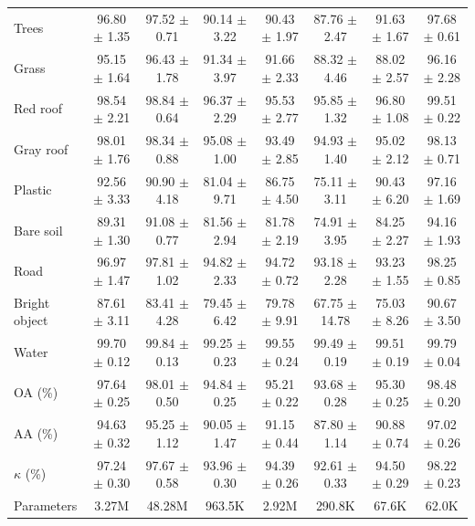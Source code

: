\begin{table}[htbp]
{\begin{tabular}{l c c c c c c c}
    Trees & \textcolor{tgred}{96.80 $\pm$ 1.35} & \textcolor{tgblue}{97.52 $\pm$ 0.71} & 90.14 $\pm$ 3.22 & 90.43 $\pm$ 1.97 & 87.76 $\pm$ 2.47 & 91.63 $\pm$ 1.67 & \textcolor{tgteal}{97.68 $\pm$ 0.61} \\
    Grass & \textcolor{tgred}{95.15 $\pm$ 1.64} & \textcolor{tgteal}{96.43 $\pm$ 1.78} & 91.34 $\pm$ 3.97 & 91.66 $\pm$ 2.33 & 88.32 $\pm$ 4.46 & 88.02 $\pm$ 2.57 & \textcolor{tgblue}{96.16 $\pm$ 2.28} \\
    Red roof & \textcolor{tgred}{98.54 $\pm$ 2.21} & \textcolor{tgblue}{98.84 $\pm$ 0.64} & 96.37 $\pm$ 2.29 & 95.53 $\pm$ 2.77 & 95.85 $\pm$ 1.32 & 96.80 $\pm$ 1.08 & \textcolor{tgteal}{99.51 $\pm$ 0.22} \\
    Gray roof & \textcolor{tgred}{98.01 $\pm$ 1.76} & \textcolor{tgteal}{98.34 $\pm$ 0.88} & 95.08 $\pm$ 1.00 & 93.49 $\pm$ 2.85 & 94.93 $\pm$ 1.40 & 95.02 $\pm$ 2.12 & \textcolor{tgblue}{98.13 $\pm$ 0.71} \\
    Plastic & \textcolor{tgblue}{92.56 $\pm$ 3.33} & \textcolor{tgred}{90.90 $\pm$ 4.18} & 81.04 $\pm$ 9.71 & 86.75 $\pm$ 4.50 & 75.11 $\pm$ 3.11 & 90.43 $\pm$ 6.20 & \textcolor{tgteal}{97.16 $\pm$ 1.69} \\
    Bare soil & \textcolor{tgred}{89.31 $\pm$ 1.30} & \textcolor{tgblue}{91.08 $\pm$ 0.77} & 81.56 $\pm$ 2.94 & 81.78 $\pm$ 2.19 & 74.91 $\pm$ 3.95 & 84.25 $\pm$ 2.27 & \textcolor{tgteal}{94.16 $\pm$ 1.93} \\
    Road & \textcolor{tgred}{96.97 $\pm$ 1.47} & \textcolor{tgblue}{97.81 $\pm$ 1.02} & 94.82 $\pm$ 2.33 & 94.72 $\pm$ 0.72 & 93.18 $\pm$ 2.28 & 93.23 $\pm$ 1.55 & \textcolor{tgteal}{98.25 $\pm$ 0.85} \\
    Bright object & \textcolor{tgblue}{87.61 $\pm$ 3.11} & \textcolor{tgred}{83.41 $\pm$ 4.28} & 79.45 $\pm$ 6.42 & 79.78 $\pm$ 9.91 & 67.75 $\pm$ 14.78 & 75.03 $\pm$ 8.26 & \textcolor{tgteal}{90.67 $\pm$ 3.50} \\
    Water & \textcolor{tgred}{99.70 $\pm$ 0.12} & \textcolor{tgteal}{99.84 $\pm$ 0.13} & 99.25 $\pm$ 0.23 & 99.55 $\pm$ 0.24 & 99.49 $\pm$ 0.19 & 99.51 $\pm$ 0.19 & \textcolor{tgblue}{99.79 $\pm$ 0.04} \\
    \midrule
    OA (\%) & \textcolor{tgred}{97.64 $\pm$ 0.25} & \textcolor{tgblue}{98.01 $\pm$ 0.50} & 94.84 $\pm$ 0.25 & 95.21 $\pm$ 0.22 & 93.68 $\pm$ 0.28 & 95.30 $\pm$ 0.25 & \textcolor{tgteal}{98.48 $\pm$ 0.20} \\
    AA (\%) & \textcolor{tgred}{94.63 $\pm$ 0.32} & \textcolor{tgblue}{95.25 $\pm$ 1.12} & 90.05 $\pm$ 1.47 & 91.15 $\pm$ 0.44 & 87.80 $\pm$ 1.14 & 90.88 $\pm$ 0.74 & \textcolor{tgteal}{97.02 $\pm$ 0.26} \\
    $\kappa$ (\%) & \textcolor{tgred}{97.24 $\pm$ 0.30} & \textcolor{tgblue}{97.67 $\pm$ 0.58} & 93.96 $\pm$ 0.30 & 94.39 $\pm$ 0.26 & 92.61 $\pm$ 0.33 & 94.50 $\pm$ 0.29 & \textcolor{tgteal}{98.22 $\pm$ 0.23} \\
    \midrule
    Parameters & 3.27M & 48.28M & 963.5K & 2.92M & 290.8K & 67.6K & 62.0K \\
    \bottomrule
  \end{tabular}%
  }
\end{table}
